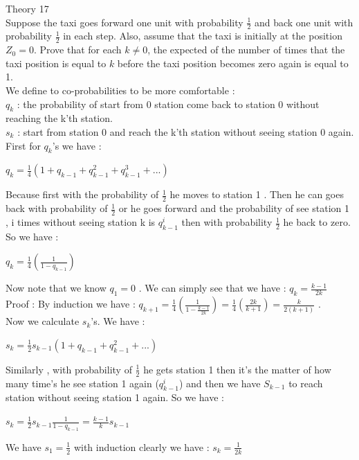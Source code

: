 \documentclass[30pt]{article}
\begin{document}
{\Large \color{blue} Theory 17 } \\
{\color{blue} Suppose the taxi goes forward one unit with probability $\frac{1}{2}$ and back one unit with probability $\frac{1}{2}$ in each step. Also, assume that the taxi is initially at the position $Z_0 = 0 $. Prove that for each $ k \neq 0 $, the expected of the number of times that the taxi position is equal to $k$ before the taxi position becomes zero again is equal to 1. } \\ \newline 
We define to co-probabilities to be more comfortable : \\ $q_k$ : the probability of start from 0 station come back to station 0 without reaching the k'th station. \\
$s_k$ : start from station 0 and reach the k'th station without seeing station 0 again. \\
First for $q_k$'s we have : 
\begin{center}
    $q_k = \frac{1}{4}(1 + q_{k-1} + q_{k-1}^2 + q_{k-1}^3 + ...) $
\end{center} 
Because first with the probability of $\frac{1}{2}$ he moves to station 1 . Then he can goes back with probability of $\frac{1}{2}$ or he goes forward and the probability of see station 1 , i times without seeing station k is $q_{k-1}^i $ then with probability $\frac{1}{2}$ he back to zero. So we have : 
\begin{center}
    $q_k = \frac{1}{4}(\frac{1}{1 - q_{k-1}}) $
\end{center} 
Now note that we know $q_1 = 0$ . We can simply see that we have : $q_k = \frac{k-1}{2k} $ \vspace{0.3cm} \\
Proof : By induction we have : $q_{k+1} = \frac{1}{4}(\frac{1}{1 - \frac{k-1}{2k}}) = \frac{1}{4}(\frac{2k}{k+1}) = \frac{k}{2(k+1)} $ . \\
Now we calculate $s_k$'s. We have : 
\begin{center}
    $s_k = \frac{1}{2} s_{k-1}(1 + q_{k-1} + q_{k-1}^2 + ... ) $
\end{center} 
Similarly , with probability of $\frac{1}{2}$ he gets station 1 then it's the matter of how many time's he see station 1 again ($q_{k-1}^i $) and then we have $S_{k-1}$ to reach station without seeing station 1 again. So we have : 
\begin{center}
    $s_k = \frac{1}{2} s_{k-1} \frac{1}{1 - q_{k-1}} = \frac{k-1}{k}s_{k-1} $
\end{center}
We have $s_1 = \frac{1}{2}$ with induction clearly we have : \hspace{0.2cm} $s_k = \frac{1}{2k} $ \\
\end{document}
